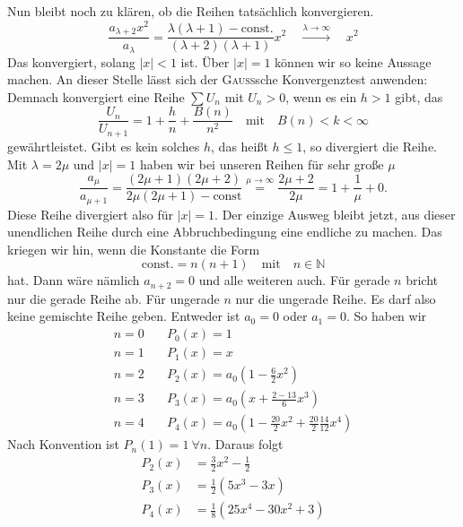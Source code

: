 \documentclass[a4paper,12pt,portrait]{book}
\numberwithin{equation}{section}
\begin{document}
Nun bleibt noch zu klären, ob die Reihen tatsächlich konvergieren. 
\begin{equation*}
\frac{a_{\lambda+2}x^2}{a_\lambda}=\frac{\lambda(\lambda+1)-\text{const.}}{(\lambda+2)(\lambda+1)}x^2 \quad \xrightarrow{\lambda\rightarrow\infty}\quad x^2
\end{equation*}
Das konvergiert, solang $|x|<1$ ist. Über $|x|=1$ können wir so keine Aussage machen. An dieser Stelle lässt sich der \textsc{Gauss}sche Konvergenztest anwenden:
Demnach konvergiert eine Reihe $\sum U_n$ mit $U_n > 0$, wenn es ein $h>1$ gibt, das
\begin{equation*}
\frac{U_n}{U_{n+1}}=1+\frac{h}{n}+\frac{B(n)}{n^2} \quad\text{mit}\quad B(n) < k < \infty
\end{equation*} 
gewährtleistet. Gibt es kein solches $h$, das heißt $h\leq 1$, so divergiert die Reihe. 
Mit $\lambda=2\mu$ und $|x|=1$ haben wir bei unseren Reihen für sehr große $\mu$
\begin{equation*}
\frac{a_\mu}{a_{\mu+1}} = \frac{(2\mu + 1)(2\mu +2 )}{2\mu(2\mu +1)-\text{const}} \stackrel{\mu\rightarrow\infty}{=}  \frac{2\mu+2}{2\mu} = 1 + \frac{1}{\mu} + 0.
\end{equation*}
Diese Reihe divergiert also für $|x|=1$. Der einzige Ausweg bleibt jetzt, aus dieser unendlichen Reihe durch eine Abbruchbedingung eine endliche zu machen. 
Das kriegen wir hin, wenn die Konstante die Form
\begin{equation*}
\text{const.} = n(n+1)\quad\text{mit}\quad n\in\mathbb{N}
\end{equation*}
hat. Dann wäre nämlich $a_{n+2}=0$ und alle weiteren auch. Für gerade $n$ bricht nur die gerade Reihe ab. Für ungerade $n$ nur die ungerade Reihe. Es darf also keine gemischte Reihe geben. Entweder ist $a_0=0$ oder $a_1=0$. So haben wir 
\begin{align*}
n=0\quad & P_0(x)=1\\
n=1\quad & P_1(x)=x\\
n=2\quad & P_2(x)=a_0\left(1-\frac{6}{2}x^2\right)\\
n=3\quad & P_3(x)=a_0\left(x+\frac{2-13}{6}x^3\right)\\
n=4\quad & P_4(x)=a_0\left(1-\frac{20}{2}x^2+\frac{20}{2}\frac{14}{12}x^4\right)
\end{align*}
Nach Konvention ist $P_n(1)=1\ \forall n$. Daraus folgt
\begin{align*}
P_2(x)&=\frac{3}{2}x^2-\frac{1}{2}\\
P_3(x)&=\frac{1}{2}\left(5x^3-3x\right)\\
P_4(x)&=\frac{1}{8}\left(25x^4-30x^2+3\right)
\end{align*}
\end{document}
